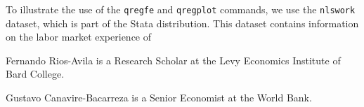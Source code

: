 \documentclass[bib]{statapress}
\begin{document}
To illustrate the use of the \texttt{qregfe} and \texttt{qregplot}
commands, we use the \texttt{nlswork} dataset, which is part of the
Stata distribution. This dataset contains information on the labor
market experience of

\clearpage





\begin{aboutauthors}

Fernando Rios-Avila is a Research Scholar at the Levy Economics
Institute of Bard College.

Gustavo Canavire-Bacarreza is a Senior Economist at the World Bank.

\end{aboutauthors}
\end{document}
